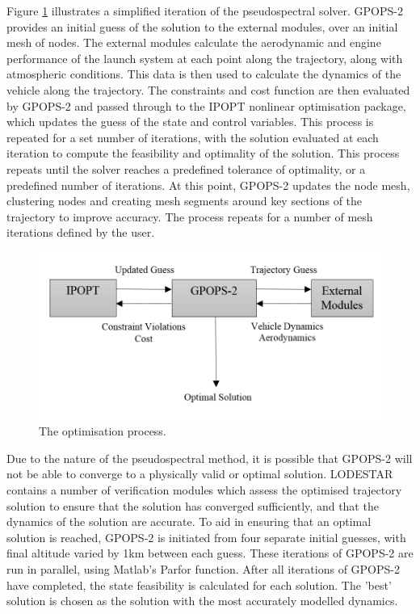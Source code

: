  


Figure \ref{fig:FlowChartSmall} illustrates a simplified iteration of the pseudospectral solver. GPOPS-2 provides an initial guess of the solution to the external modules, over an initial mesh of nodes.
The external modules calculate the aerodynamic and engine performance of the launch system at each point along the trajectory, along with atmospheric conditions. This data is then used to calculate the dynamics of the vehicle along the trajectory. The constraints and cost function are then evaluated by GPOPS-2 and passed through to the IPOPT nonlinear optimisation package\cite{Wachter2006}, which updates the guess of the state and control variables. This process is repeated for a set number of iterations, with the solution evaluated at each iteration to compute the feasibility and optimality of the solution. This process repeats until the solver reaches a predefined tolerance of optimality, or a predefined number of iterations. At this point, GPOPS-2 updates the node mesh, clustering nodes and creating mesh segments around key sections of the trajectory to improve accuracy. The process repeats for a number of mesh iterations defined by the user. 
\begin{figure}[ht]
	\centering
	\includegraphics[width=0.75\linewidth]{figures/4_LODESTAR/FlowChartSmall}
	\caption{The optimisation process.}
	\label{fig:FlowChartSmall}
\end{figure}

Due to the nature of the pseudospectral method, it is possible that GPOPS-2 will not be able to converge to a physically valid or optimal solution. 
LODESTAR contains a number of verification modules which assess the optimised trajectory solution to ensure that the solution has converged sufficiently, and that the dynamics of the solution are accurate. 
To aid in ensuring that an optimal solution is reached, GPOPS-2 is initiated from four separate initial guesses, with final altitude varied by 1km between each guess. These iterations of GPOPS-2 are run in parallel, using Matlab's Parfor function. After all iterations of GPOPS-2 have completed, the state feasibility is calculated for each solution. The 'best' solution is chosen as the solution with the most accurately modelled dynamics. 



